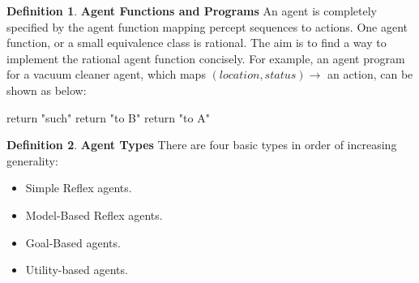\documentclass{article}
\theoremstyle{definition}
\newtheorem{defi}{Definition}[section]
\begin{document}
\begin{defi}
\textbf{Agent Functions and Programs} An agent is completely specified by the agent function mapping percept sequences to actions. One agent function, or a small equivalence class is rational. The aim is to find a way to implement the rational agent function concisely. For example, an agent program for a vacuum cleaner agent, which maps $(location, status)\to$ an action, can be shown as below:

\begin{algorithmic}
    \STATE return "such"
    \STATE return "to B"
    \STATE return "to A"
  \ENDIF
\end{algorithmic}
\end{defi}
\begin{defi}
\textbf{Agent Types} There are four basic types in order of increasing generality:
\begin{itemize}
    \item Simple Reflex agents.
    \item Model-Based Reflex agents.
    \item Goal-Based agents.
    \item Utility-based agents.
\end{itemize}
\end{defi}
\end{document}
